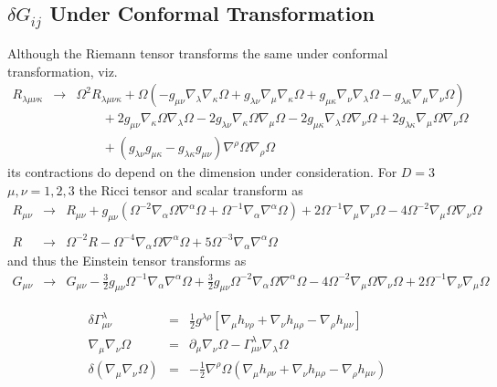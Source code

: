 \documentclass[10pt,letterpaper]{article}
\numberwithin{equation}{section}
\begin{document}
\begin{appendices}
\section{$\delta G_{ij}$ Under Conformal Transformation}
Although the Riemann tensor transforms the same under conformal transformation, viz.
\begin{eqnarray}
R_{\lambda\mu\nu\kappa} &\to& \Omega^2 R_{\lambda\mu\nu\kappa} + \Omega\left ( -g_{\mu\nu}\nabla_\lambda \nabla_\kappa \Omega
+ g_{\lambda\nu}\nabla_\mu\nabla_\kappa \Omega + g_{\mu\kappa} \nabla_\nu\nabla_\lambda \Omega - g_{\lambda\kappa} \nabla_\mu\nabla_\nu \Omega \right)
\nonumber\\
&&\qquad+ 2g_{\mu\nu} \nabla_\kappa\Omega \nabla_\lambda\Omega - 2g_{\lambda\nu} \nabla_\kappa\Omega \nabla_\mu\Omega - 2g_{\mu\kappa}
\nabla_\lambda\Omega \nabla_\nu\Omega + 2g_{\lambda\kappa} \nabla_\mu \Omega \nabla_\nu\Omega
\nonumber\\
&&\qquad + (g_{\lambda\nu} g_{\mu\kappa}-g_{\lambda\kappa}g_{\mu\nu})\nabla^\rho \Omega \nabla_\rho \Omega
\end{eqnarray}
its contractions do depend on the dimension under consideration. For $D=3$ $\mu,\nu = 1,2,3$ the Ricci tensor and scalar transform as
\begin{eqnarray}
R_{\mu\nu} &\to& R_{\mu \nu} +g_{\mu\nu}\left( \Omega^{-2} \nabla_\alpha\Omega \nabla^\alpha\Omega + \Omega^{-1}\nabla_\alpha \nabla^\alpha \Omega\right) + 2\Omega^{-1}\nabla_\mu\nabla_\nu\Omega - 4\Omega^{-2}\nabla_\mu\Omega\nabla_\nu\Omega
\nonumber\\ \nonumber\\
R &\to& \Omega^{-2}R -\Omega^{-4}\nabla_\alpha\Omega\nabla^\alpha\Omega + 5\Omega^{-3}\nabla_\alpha\nabla^\alpha\Omega
\end{eqnarray}
and thus the Einstein tensor transforms as
\begin{eqnarray}
G_{\mu\nu} &\to& G_{\mu\nu} - \tfrac{3}{2} g_{\mu \nu} \Omega^{-1} \nabla_{\alpha}\nabla^{\alpha}\Omega + \tfrac{3}{2} g_{\mu \nu} \Omega^{-2} \nabla_{\alpha}\Omega \nabla^{\alpha}\Omega - 4 \Omega^{-2} \nabla_{\mu}\Omega \nabla_{\nu}\Omega + 2 \Omega^{-1} \nabla_{\nu}\nabla_{\mu}\Omega
\label{gbg}
\end{eqnarray}

\begin{eqnarray}
\delta \Gamma^\lambda_{\mu\nu} &=& \tfrac12 g^{\lambda\rho}\left[ \nabla_\mu h_{\nu\rho} + \nabla_\nu h_{\mu\rho} - \nabla_\rho h_{\mu\nu} \right]
\nonumber\\
\nabla_\mu \nabla_\nu \Omega  &=& \partial_\mu \nabla_\nu \Omega  - \Gamma^\lambda_{\mu\nu} \nabla_\lambda\Omega
\nonumber\\
\delta (\nabla_\mu \nabla_\nu \Omega) &=& -\tfrac12 \nabla^\rho \Omega (\nabla_\mu h_{\rho\nu} + \nabla_\nu h_{\mu\rho} - \nabla_\rho h_{\mu\nu})
\end{eqnarray}


\end{appendices}
\end{document}
